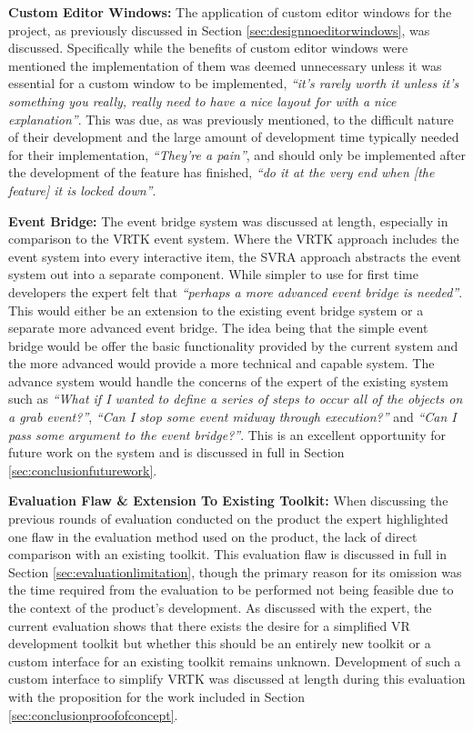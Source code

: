 \documentclass{l4proj}
\begin{document}
\textbf{Custom Editor Windows:} The application of custom editor windows for the project, as previously discussed in Section \ref{sec:designnoeditorwindows}, was discussed. Specifically while the benefits of custom editor windows were mentioned the implementation of them was deemed unnecessary unless it was essential for a custom window to be implemented, \textit{``it’s rarely worth it unless it’s something you really, really need to have a nice layout for with a nice explanation''}. This was due, as was previously mentioned, to the difficult nature of their development and the large amount of development time typically needed for their implementation, \textit{``They're a pain''}, and should only be implemented after the development of the feature has finished, \textit{``do it at the very end when [the feature] it is locked down''}. 

\textbf{Event Bridge:} The event bridge system was discussed at length, especially in comparison to the VRTK event system. Where the VRTK approach includes the event system into every interactive item, the SVRA approach abstracts the event system out into a separate component. While simpler to use for first time developers the expert felt that \textit{``perhaps a more advanced event bridge is needed''}. This would either be an extension to the existing event bridge system or a separate more advanced event bridge. The idea being that the simple event bridge would be offer the basic functionality provided by the current system and the more advanced would provide a more technical and capable system. The advance system would handle the concerns of the expert of the existing system such as \textit{``What if I wanted to define a series of steps to occur all of the objects on a grab event?''}, \textit{``Can I stop some event midway through execution?''} and \textit{``Can I pass some argument to the event bridge?''}. This is an excellent opportunity for future work on the system and is discussed in full in Section \ref{sec:conclusionfuturework}.

\textbf{Evaluation Flaw \& Extension To Existing Toolkit:} When discussing the previous rounds of evaluation conducted on the product the expert highlighted one flaw in the evaluation method used on the product, the lack of direct comparison with an existing toolkit. This evaluation flaw is discussed in full in Section \ref{sec:evaluationlimitation}, though the primary reason for its omission was the time required from the evaluation to be performed not being feasible due to the context of the product's development. As discussed with the expert, the current evaluation shows that there exists the desire for a simplified VR development toolkit but whether this should be an entirely new toolkit or a custom interface for an existing toolkit remains unknown. Development of such a custom interface to simplify VRTK was discussed at length during this evaluation with the proposition for the work included in Section \ref{sec:conclusionproofofconcept}.
\end{document}
